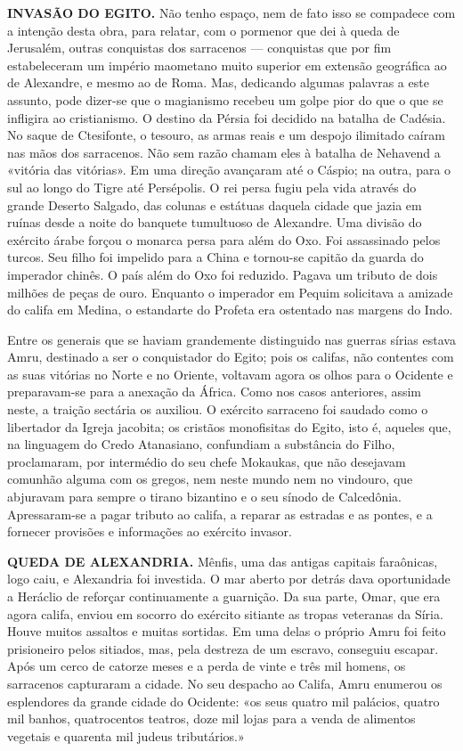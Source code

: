 \documentclass[11pt,a5paper,twoside,openany]{book}
\begin{document}
\textbf{INVASÃO DO EGITO.} Não tenho espaço, nem de fato isso se compadece com a intenção desta obra, para relatar, com o pormenor que dei à queda de Jerusalém, outras conquistas dos sarracenos — conquistas que por fim estabeleceram um império maometano muito superior em extensão geográfica ao de Alexandre, e mesmo ao de Roma. Mas, dedicando algumas palavras a este assunto, pode dizer-se que o magianismo recebeu um golpe pior do que o que se infligira ao cristianismo. O destino da Pérsia foi decidido na batalha de Cadésia. No saque de Ctesifonte, o tesouro, as armas reais e um despojo ilimitado caíram nas mãos dos sarracenos. Não sem razão chamam eles à batalha de Nehavend a «vitória das vitórias». Em uma direção avançaram até o Cáspio; na outra, para o sul ao longo do Tigre até Persépolis. O rei persa fugiu pela vida através do grande Deserto Salgado, das colunas e estátuas daquela cidade que jazia em ruínas desde a noite do banquete tumultuoso de Alexandre. Uma divisão do exército árabe forçou o monarca persa para além do Oxo. Foi assassinado pelos turcos. Seu filho foi impelido para a China e tornou-se capitão da guarda do imperador chinês. O país além do Oxo foi reduzido. Pagava um tributo de dois milhões de peças de ouro. Enquanto o imperador em Pequim solicitava a amizade do califa em Medina, o estandarte do Profeta era ostentado nas margens do Indo.

Entre os generais que se haviam grandemente distinguido nas guerras sírias estava Amru, destinado a ser o conquistador do Egito; pois os califas, não contentes com as suas vitórias no Norte e no Oriente, voltavam agora os olhos para o Ocidente e preparavam-se para a anexação da África. Como nos casos anteriores, assim neste, a traição sectária os auxiliou. O exército sarraceno foi saudado como o libertador da Igreja jacobita; os cristãos monofisitas do Egito, isto é, aqueles que, na linguagem do Credo Atanasiano, confundiam a substância do Filho, proclamaram, por intermédio do seu chefe Mokaukas, que não desejavam comunhão alguma com os gregos, nem neste mundo nem no vindouro, que abjuravam para sempre o tirano bizantino e o seu sínodo de Calcedônia. Apressaram-se a pagar tributo ao califa, a reparar as estradas e as pontes, e a fornecer provisões e informações ao exército invasor.

\textbf{QUEDA DE ALEXANDRIA.} Mênfis, uma das antigas capitais faraônicas, logo caiu, e Alexandria foi investida. O mar aberto por detrás dava oportunidade a Heráclio de reforçar continuamente a guarnição. Da sua parte, Omar, que era agora califa, enviou em socorro do exército sitiante as tropas veteranas da Síria. Houve muitos assaltos e muitas sortidas. Em uma delas o próprio Amru foi feito prisioneiro pelos sitiados, mas, pela destreza de um escravo, conseguiu escapar. Após um cerco de catorze meses e a perda de vinte e três mil homens, os sarracenos capturaram a cidade. No seu despacho ao Califa, Amru enumerou os esplendores da grande cidade do Ocidente: «os seus quatro mil palácios, quatro mil banhos, quatrocentos teatros, doze mil lojas para a venda de alimentos vegetais e quarenta mil judeus tributários.»
\end{document}
